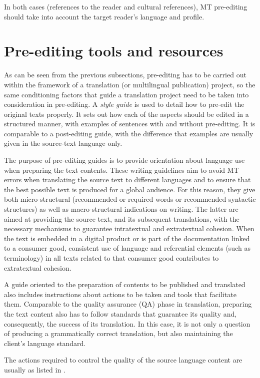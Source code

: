 \documentclass[output=paper,colorlinks,citecolor=brown,
]{langscibook}
\begin{document}
In both cases (references to the reader and cultural references), MT pre-editing should take into account the target reader’s language and profile. 

\section{Pre-editing tools and resources}\label{sec:sanchez:7}

As can be seen from the previous subsections, pre-editing has to be carried out within the framework of a translation (or multilingual publication) project, so the same conditioning factors that guide a translation project need to be taken into consideration in pre-editing. A \textit{style guide} is used to detail how to pre-edit the original texts properly. It sets out how each of the aspects should be edited in a structured manner, with examples of sentences with and without pre-editing. It is comparable to a post-editing guide, with the difference that examples are usually given in the source-text language only.

The purpose of pre-editing guides is to provide orientation about language use when preparing the text contents. These writing guidelines aim to avoid MT errors when translating the source text to different languages and to ensure that the best possible text is produced for a global audience. For this reason, they give both micro-structural (recommended or required words or recommended syntactic structures) as well as macro-structural indications on writing. The latter are aimed at providing the source text, and its subsequent translations, with the necessary mechanisms to guarantee intratextual and extratextual cohesion. When the text is embedded in a digital product or is part of the documentation linked to a consumer good, consistent use of language and referential elements (such as terminology) in all texts related to that consumer good contributes to extratextual cohesion. 

A guide oriented to the preparation of contents to be published and translated also includes instructions about actions to be taken and tools that facilitate them. Comparable to the quality assurance (QA) phase in translation, preparing the text content also has to follow standards that guarantee its quality and, consequently, the success of its translation. In this case, it is not only a question of producing a grammatically correct translation, but also maintaining the client’s language standard.

The actions required to control the quality of the source language content are usually as listed in .
\end{document}
